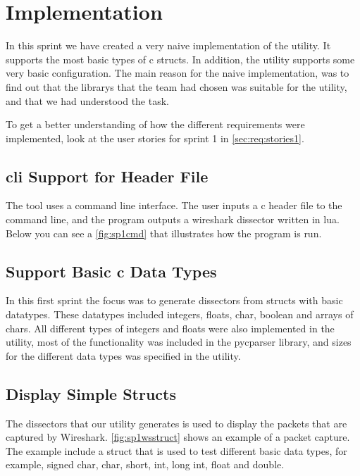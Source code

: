 \section{Implementation}
\label{sec:sp1:impl}
In this sprint we have created a very naive implementation of the \gls{utility}. It
supports the most basic types of \Gls{c} \glspl{struct}. In addition, the \gls{utility} supports
some very basic configuration. The main reason for the naive implementation, 
was to find out that the \glspl{library} that the team had chosen was suitable for 
the \gls{utility}, and that we had understood the task.

To get a better understanding of how the different requirements were implemented,
look at the user stories for sprint 1 in \autoref{sec:req:stories1}.


\subsection{\gls{cli} Support for Header File}
The tool uses a command line interface. The user inputs a \Gls{c} \gls{header} file to the 
command line, and the program outputs a \Gls{wireshark} \gls{dissector} written in \Gls{lua}. 
Below you can see a \autoref{fig:sp1cmd} that illustrates how the program is 
run. 

\subsection{Support Basic \Gls{c} Data Types}
In this first sprint the focus was to generate \glspl{dissector} from \glspl{struct} with 
basic datatypes. These datatypes included \glspl{integer}, \glspl{float}, \gls{char}, \gls{boolean} and 
\glspl{array} of \glspl{char}. All different types of \glspl{integer} and \glspl{float} were also 
implemented in the \gls{utility}, most of the functionality was included in the 
\gls{pycparser} \gls{library}, and sizes for the different data types was specified in the 
\gls{utility}.

\subsection{Display Simple Structs}
The \glspl{dissector} that our \gls{utility} generates is used to display the \glspl{packet} that 
are captured by Wireshark. \autoref{fig:sp1wsstruct} shows an example of a 
\gls{packet} capture. The example include a \gls{struct} that is used to test different 
basic data types, for example, signed \gls{char}, \gls{char}, short, \gls{int}, long \gls{int}, \gls{float} 
and \gls{double}.

